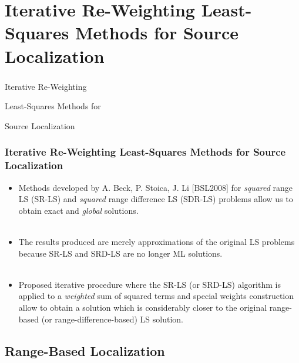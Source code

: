 \documentclass [t] {beamer} %
\begin{document}
\section[Chapter 2]{Iterative Re-Weighting Least-Squares Methods for Source Localization}


\begin{frame} [noframenumbering]
\frametitle{  }
\phantom{m} 
\phantom{m}
\phantom{m} 
\phantom{m}
\phantom{m} 
\phantom{m}
\Huge{\centerline{Iterative Re-Weighting}}

\Huge{\centerline{Least-Squares Methods for}}

\Huge{\centerline{Source Localization}}

\end{frame}

\begin{frame} %
\frametitle{Iterative Re-Weighting Least-Squares Methods for Source
Localization}
\phantom{m}
\begin{itemize}
\item
Methods developed by A. Beck, P. Stoica, J. Li [BSL2008] for \textit{squared} range LS (SR-LS) and \textit{squared} range difference LS (SDR-LS) problems allow us to obtain exact and \textit{global}  solutions.
\\~\\
\item
The results produced are merely approximations of the original LS
problems because SR-LS and SRD-LS are no longer ML solutions.
\\~\\
\item
Proposed iterative procedure where the SR-LS (or SRD-LS) algorithm is applied to a \textit{weighted} sum of squared terms and special weights construction allow to obtain a solution which is considerably closer to
the original range-based (or range-difference-based) LS solution.
\end{itemize}
\end{frame}


\subsection{Range-Based Localization} %
\end{document}
